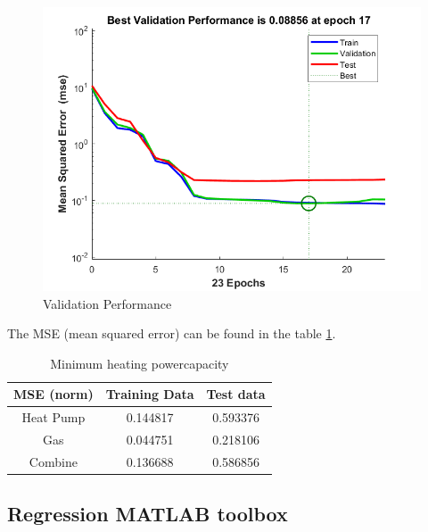 \begin{figure}[H]
	\centering
	\includegraphics[width=1.0\columnwidth]{Pictures/Validation Performance.png}
	\caption[Short title]{Validation Performance}
	\label{fig:Validation Performance}
	\end{figure}
	
The MSE (mean squared error) can be found in the table \ref{tab:Minimumheat}.

\begin{table}[H]
    \centering
    \begin{tabular}{|c|c|c|}
    \hline
    MSE (norm) & Training Data & Test data \\
    
    \hline
     Heat Pump     &  0.144817 & 0.593376\\
     
     \hline
     Gas           &  0.044751 & 0.218106\\
     
     \hline
     Combine       &  0.136688   & 0.586856\\
    \hline


    \end{tabular}
    \caption{Minimum heating powercapacity}
    \label{tab:Minimumheat}
\end{table}

\subsection{Regression MATLAB toolbox}


